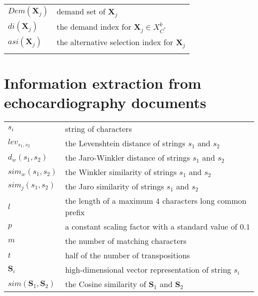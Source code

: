 \begin{tabular}{lp{10cm}}
	$Dem(\textbf{X}_j)$            & demand set of $\textbf{X}_j$                                                                                 \\
	$di(\textbf{X}_j)$             & the demand index for $\textbf{X}_j \in X_{C^*}^{k}$                                                          \\
	$asi(\textbf{X}_j)$            & the alternative selection index for $\textbf{X}_j$                                                           \\                                                                       \\    
\end{tabular}

\section*{Information extraction from echocardiography documents}

\begin{tabular}{lp{10cm}}
        $s_i$ & string of characters \\
        
	$lev_{s_1,s_2}$                  & the Levenshtein distance of strings $s_1$ and $s_2$        \\
	$d_w(s_1,s_2)$                   & the Jaro-Winkler distance of strings $s_1$ and $s_2$      \\
	$sim_w(s_1,s_2)$                 & the Winkler similarity of strings $s_1$ and $s_2$          \\
	$sim_j(s_1,s_2)$                 & the Jaro similarity of strings $s_1$ and $s_2$             \\
	$l$                              & the length of a maximum 4 characters long common prefix    \\
	$p$                              & a constant scaling factor with a standard value of $0.1$   \\
	$m$                              & the number of matching characters                          \\
	$t$                              & half of the number of transpositions                       \\
	$\textbf{S}_i$                   & high-dimensional vector representation of string $s_i$    \\
	$sim(\textbf{S}_1,\textbf{S}_2)$ & the Cosine similarity of $\textbf{S}_1$ and $\textbf{S}_2$ \\    
\end{tabular}